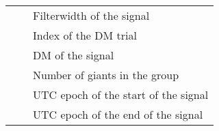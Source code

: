 \begin{table}[]
\begin{tabular}{lll}
																																																									&                                                            & Filterwidth of the signal                                                                                            \\
																																																									&                                                            & Index of the DM trial                                                                                                \\
																																																									&                                                            & DM of the signal                                                                                                     \\
																																																									&                                                            & Number of giants in the group                                                                                        \\
																																																									&                                                            & UTC epoch of the start of the signal                                                                                 \\
																																																									&                                                            & UTC epoch of the end of the signal                                                                                  
										 
 \end{tabular}
\end{table}
